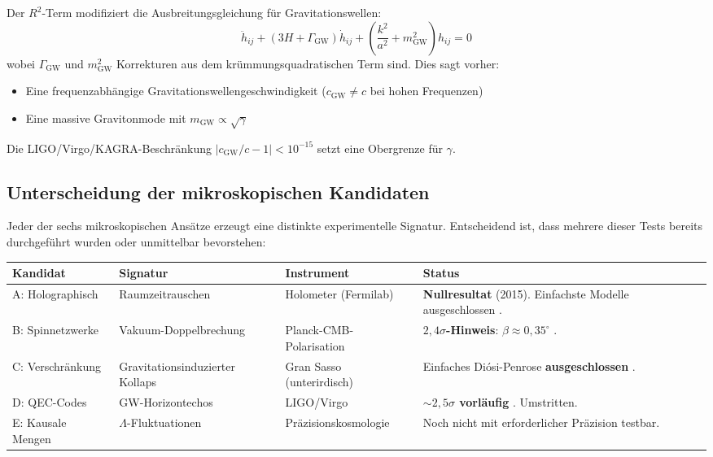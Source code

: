 \documentclass[11pt,a4paper]{article}
\begin{document}
Der $R^2$-Term modifiziert die Ausbreitungsgleichung f\"ur Gravitationswellen:
\begin{equation}
\ddot{h}_{ij} + (3H + \Gamma_{\mathrm{GW}})\dot{h}_{ij} + \left(\frac{k^2}{a^2} + m_{\mathrm{GW}}^2\right) h_{ij} = 0
\end{equation}
wobei $\Gamma_{\mathrm{GW}}$ und $m_{\mathrm{GW}}^2$ Korrekturen aus dem kr\"ummungsquadratischen Term sind. Dies sagt vorher:
\begin{itemize}
\item Eine frequenzabh\"angige Gravitationswellengeschwindigkeit ($c_{\mathrm{GW}} \neq c$ bei hohen Frequenzen)
\item Eine massive Gravitonmode mit $m_{\mathrm{GW}} \propto \sqrt{\gamma}$
\end{itemize}
Die LIGO/Virgo/KAGRA-Beschr\"ankung $|c_{\mathrm{GW}}/c - 1| < 10^{-15}$ \cite{Abbott2017} setzt eine Obergrenze f\"ur $\gamma$.

\subsection{Unterscheidung der mikroskopischen Kandidaten}

Jeder der sechs mikroskopischen Ans\"atze erzeugt eine distinkte experimentelle Signatur. Entscheidend ist, dass mehrere dieser Tests bereits durchgef\"uhrt wurden oder unmittelbar bevorstehen:

\begin{center}
\small
\begin{tabular}{lllp{3.4cm}}
\toprule
\textbf{Kandidat} & \textbf{Signatur} & \textbf{Instrument} & \textbf{Status} \\
\midrule
A: Holographisch & Raumzeitrauschen & Holometer (Fermilab) & \textbf{Nullresultat} (2015). Einfachste Modelle ausgeschlossen \cite{Chou2017}. \\
B: Spinnetzwerke & Vakuum-Doppelbrechung & Planck-CMB-Polarisation & \textbf{$2{,}4\sigma$-Hinweis}: $\beta \approx 0{,}35^\circ$ \cite{Minami2020}. \\
C: Verschr\"ankung & Gravitationsinduzierter Kollaps & Gran Sasso (unterirdisch) & Einfaches Di\'osi-Penrose \textbf{ausgeschlossen} \cite{Donadi2021}. \\
D: QEC-Codes & GW-Horizontechos & LIGO/Virgo & \textbf{$\sim2{,}5\sigma$ vorl\"aufig} \cite{Abedi2017}. Umstritten. \\
E: Kausale Mengen & $\Lambda$-Fluktuationen & Pr\"azisionskosmologie & Noch nicht mit erforderlicher Pr\"azision testbar. \\
\bottomrule
\end{tabular}
\end{center}
\end{document}
